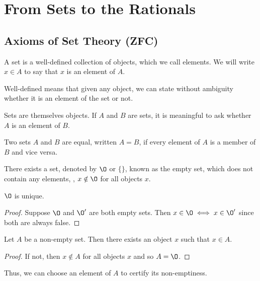 \chapter{From Sets to the Rationals} \label{sec:szq}

\section{Axioms of Set Theory (ZFC)} \label{sec:zfc}

\begin{definition*}[Set] \label{def:zfc:set}
    A set is a well-defined collection of objects, which we call elements.
    We will write $x \in A$ to say that $x$ is an element of $A$.
\end{definition*}
Well-defined means that given any object, we can state without ambiguity whether
it is an element of the set or not.

\begin{axiom} \label{def:zfc:sets_are_objects}
    Sets are themselves objects.
    If $A$ and $B$ are sets, it is meaningful to ask whether $A$ is an element
    of $B$.
\end{axiom}

\begin{axiom}[Extensionality] \label{def:zfc:extensionality}
    Two sets $A$ and $B$ are equal, written $A = B$, if every element of $A$ is
    a member of $B$ and vice versa.
\end{axiom}

\begin{axiom}[Existence] \label{def:zfc:existence}
    There exists a set, denoted by $\O$ or $\{\}$, known as the empty set, which
    does not contain any elements, \ie, $x \notin \O$ for all objects $x$.
\end{axiom}

\begin{exercise}
    $\O$ is unique.
\end{exercise}
\begin{proof}
    Suppose $\O$ and $\O'$ are both empty sets.
    Then $x \in \O \iff x \in \O'$ since both are always false.
\end{proof}

\begin{lemma} \label{thm:zfc:single_choice}
    Let $A$ be a non-empty set.
    Then there exists an object $x$ such that $x \in A$.
\end{lemma}
\begin{proof}
    If not, then $x \notin A$ for all objects $x$ and so $A = \O$.
\end{proof}
Thus, we can choose an element of $A$ to certify its non-emptiness.

